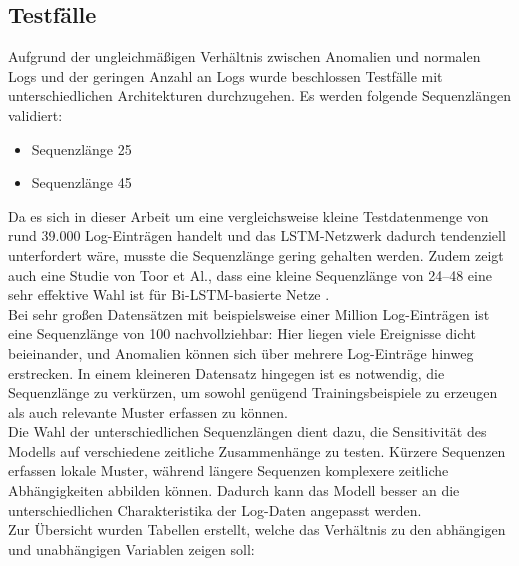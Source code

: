 \documentclass[a4paper,12pt]{article}
\begin{document}
	\subsection{Testfälle}
	Aufgrund der ungleichmäßigen Verhältnis zwischen Anomalien und normalen Logs und der geringen Anzahl an Logs wurde beschlossen Testfälle mit unterschiedlichen Architekturen durchzugehen.
	Es werden folgende Sequenzlängen validiert:
	
	\begin{itemize}
		\item Sequenzlänge 25
		\item Sequenzlänge 45
	\end{itemize}
	
	Da es sich in dieser Arbeit um eine vergleichsweise kleine Testdatenmenge von rund 39.000 Log-Einträgen handelt und das LSTM-Netzwerk dadurch tendenziell unterfordert wäre, musste die Sequenzlänge gering gehalten werden. Zudem zeigt auch eine Studie von Toor et Al., dass eine kleine Sequenzlänge von 24–48 eine sehr effektive Wahl ist für Bi-LSTM-basierte Netze \cite{Toor2022}. 
	\\[0.5em]
	Bei sehr großen Datensätzen mit beispielsweise einer Million Log-Einträgen ist eine Sequenzlänge von 100 nachvollziehbar: Hier liegen viele Ereignisse dicht beieinander, und Anomalien können sich über mehrere Log-Einträge hinweg erstrecken. In einem kleineren Datensatz hingegen ist es notwendig, die Sequenzlänge zu verkürzen, um sowohl genügend Trainingsbeispiele zu erzeugen als auch relevante Muster erfassen zu können.
	\\[0.5em]
	Die Wahl der unterschiedlichen Sequenzlängen dient dazu, die Sensitivität des Modells auf verschiedene zeitliche Zusammenhänge zu testen. Kürzere Sequenzen erfassen lokale Muster, während längere Sequenzen komplexere zeitliche Abhängigkeiten abbilden können. Dadurch kann das Modell besser an die unterschiedlichen Charakteristika der Log-Daten angepasst werden.
	\\[0.5em]
	Zur Übersicht wurden Tabellen erstellt, welche das Verhältnis zu den abhängigen und unabhängigen Variablen zeigen soll:
	\\[0.5em]
	
\end{document}
